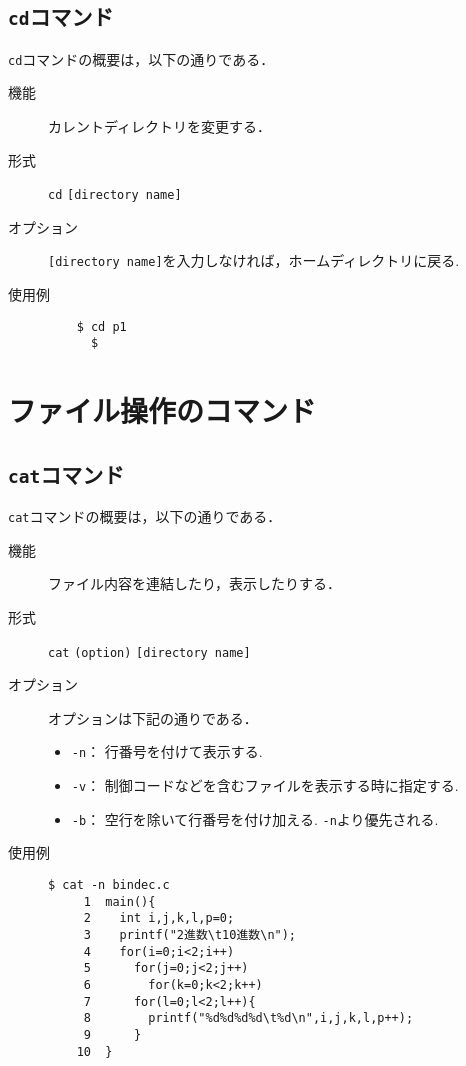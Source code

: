 \documentclass[a4j,11pt]{jarticle}
\begin{document}
\subsection{\texttt{cd}コマンド}
\verb|cd|コマンドの概要は，以下の通りである．
\begin{description}
  \item[機能] %
    カレントディレクトリを変更する．
  \item[形式] %
    \verb|cd| \verb|[directory name]|
  \item[オプション] %
    \verb|[directory name]|を入力しなければ，ホームディレクトリに戻る.
  \item[使用例] %
    \begin{verbatim}
    $ cd p1
      $
    \end{verbatim}
\end{description}
\section{ファイル操作のコマンド}

\subsection{\texttt{cat}コマンド}
\verb|cat|コマンドの概要は，以下の通りである．
\begin{description}
  \item[機能] %
    ファイル内容を連結したり，表示したりする．
  \item[形式] %
    \verb|cat| \verb|(option)| \verb|[directory name]|
  \item[オプション] %
オプションは下記の通りである．
 \begin{itemize}
      \item \verb|-n|：  行番号を付けて表示する.
      \item \verb|-v|：  制御コードなどを含むファイルを表示する時に指定する.
      \item \verb|-b|：  空行を除いて行番号を付け加える. \verb|-n|より優先される.
    \end{itemize}
  \item[使用例] %
    \begin{verbatim}
$ cat -n bindec.c
     1	main(){
     2	  int i,j,k,l,p=0;
     3	  printf("2進数\t10進数\n");
     4	  for(i=0;i<2;i++)
     5	    for(j=0;j<2;j++)
     6	      for(k=0;k<2;k++)
     7		for(l=0;l<2;l++){
     8		  printf("%d%d%d%d\t%d\n",i,j,k,l,p++);
     9		}
    10	}

    \end{verbatim}
\end{description}
\end{document}
